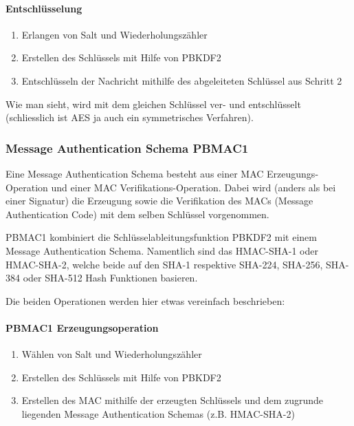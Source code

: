\documentclass[10pt,a4paper]{article}
\begin{document}
\paragraph{Entschlüsselung}
\begin{enumerate}
    \item Erlangen von Salt und Wiederholungszähler
    \item Erstellen des Schlüssels mit Hilfe von PBKDF2
    \item Entschlüsseln der Nachricht mithilfe des abgeleiteten Schlüssel aus Schritt 2
\end{enumerate}

Wie man sieht, wird mit dem gleichen Schlüssel ver- und entschlüsselt (schliesslich ist
AES ja auch ein symmetrisches Verfahren).

\subsubsection{Message Authentication Schema PBMAC1}
Eine Message Authentication Schema besteht aus einer MAC Erzeugungs-Operation und einer
MAC Verifikations-Operation. Dabei wird (anders als bei einer Signatur) die Erzeugung
sowie die Verifikation des MACs (Message Authentication Code) mit dem selben Schlüssel
vorgenommen.

PBMAC1 kombiniert die Schlüsselableitungsfunktion PBKDF2 mit einem Message Authentication
Schema. Namentlich sind das HMAC-SHA-1 oder HMAC-SHA-2, welche beide auf den SHA-1
respektive SHA-224, SHA-256, SHA-384 oder SHA-512 Hash Funktionen basieren.

Die beiden Operationen werden hier etwas vereinfach beschrieben:

\paragraph{PBMAC1 Erzeugungsoperation}
\begin{enumerate}
    \item Wählen von Salt und Wiederholungszähler
    \item Erstellen des Schlüssels mit Hilfe von PBKDF2
    \item Erstellen des MAC mithilfe der erzeugten Schlüssels und dem zugrunde liegenden
        Message Authentication Schemas (z.B. HMAC-SHA-2)
\end{enumerate}
\end{document}
